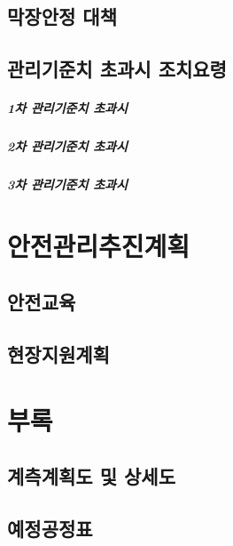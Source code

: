 	\section{막장안정 대책}
	
	\section{관리기준치 초과시 조치요령}

		\paragraph{1차 관리기준치 초과시}
	
		\paragraph{2차 관리기준치 초과시}

		\paragraph{3차 관리기준치 초과시}

	\chapter{안전관리추진계획}
	\minitoc				%
	
	\section{안전교육}
	
	\section{현장지원계획}


	\chapter{부록}
	\minitoc				%

	\section{계측계획도 및 상세도}

	\section{예정공정표}
	




